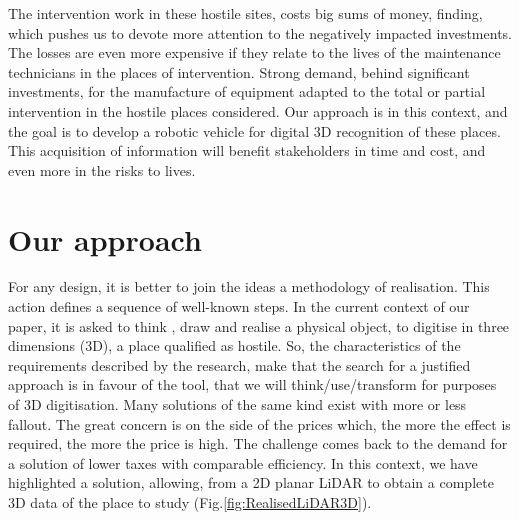 \documentclass[Afour,sageh,times]{sagej}
\begin{document}
The intervention work in these hostile sites, costs big sums of money, finding, which pushes us to devote more attention to the negatively impacted investments.
The losses are even more expensive if they relate to the lives of the maintenance technicians in the places of intervention.
Strong demand, behind significant investments, for the manufacture of equipment adapted to the total or partial intervention in the hostile places considered. Our approach is in this context, and the goal is to develop a robotic vehicle for digital 3D recognition of these places. This acquisition of information will benefit stakeholders in time and cost, and even more in the risks to lives.

\section{Our approach}
For any design, it is better to join the ideas a methodology of realisation. This action defines a sequence of well-known steps.
In the current context of our paper, it is asked to think \citep{Oudeyer2004}, draw and realise a physical object, to digitise in three dimensions (3D), a place qualified as hostile.
So, the characteristics of the requirements described by the research, make that the search for a justified approach is in favour of the tool, that we will think/use/transform for purposes of 3D digitisation.
Many solutions of the same kind exist with more or less fallout. The great concern is on the side of the prices which, the more the effect is required, the more the price is high. The challenge comes back to the demand for a solution of lower taxes with comparable efficiency.
In this context, we have highlighted a solution, allowing, from a 2D planar LiDAR to obtain a complete 3D data of the place to study (Fig.\ref{fig:RealisedLiDAR3D}).
\end{document}
